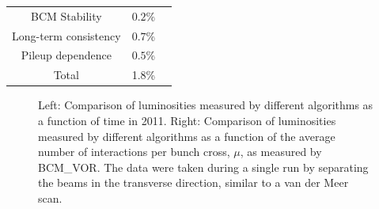 \begin{table}[htbp]
\begin{tabular}{ccl}
		BCM Stability & $0.2\%$ & \\
		{Long-term consistency} & {$0.7\%$} & \\
		{Pileup dependence} & {$0.5\%$} & \\
		\hline
		\hline
		Total & 1.8\% & \\
		\hline
	\end{tabular}
\end{table}

\begin{figure}
	\centering
	\hfill
	\caption{Left:  Comparison of luminosities measured by different algorithms as a function of time in 2011. Right:  Comparison of luminosities measured by different algorithms as a function of the average number of interactions per bunch cross, $\mu$, as measured by BCM\_VOR. The data were taken during a single run by separating the beams in the transverse direction, similar to a van der Meer scan.}
	\label{fig:reco-luminosity-comparisons}
\end{figure}

